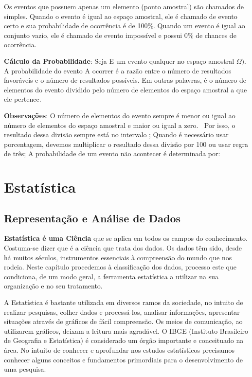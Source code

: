 \begin{multicols*}{2}
Os eventos que possuem apenas um elemento (ponto amostral) são chamados de simples. Quando o evento é igual ao espaço amostral, ele é chamado de evento certo e sua probabilidade de ocorrência é de 100\%. Quando um evento é igual ao conjunto vazio, ele é chamado de evento impossível e possui 0\% de chances de ocorrência.

\textbf{Cálculo da Probabilidade}: Seja E um evento qualquer no espaço amostral $\Omega)$. A probabilidade do evento A ocorrer é a razão entre o número de resultados favoráveis e o número de resultados possíveis. Em outras palavras, é o número de elementos do evento dividido pelo número de elementos do espaço amostral a que ele pertence.


\textbf{Observações}:  O número de elementos do evento sempre é menor ou igual ao número de elementos do espaço amostral e maior ou igual a zero. $ \ $ Por isso, o resultado dessa divisão sempre está no intervalo ; Quando é necessário usar porcentagem, devemos multiplicar o resultado dessa divisão por 100 ou usar regra de três;
A probabilidade de um evento não acontecer é determinada por:






	
\section{Estatística}

\subsection{Representação e Análise de Dados}
\textbf{ Estatística é uma Ciência} que se aplica em todos os campos do conhecimento. Costuma-se dizer que é a ciência que trata dos dados. Os dados têm sido, desde há muitos séculos, instrumentos essenciais à compreensão do mundo que nos rodeia. Neste capítulo procedemos à classificação dos dados, processo este que condiciona, de um modo geral, a ferramenta estatística a utilizar na sua organização e no seu tratamento.

A Estatística é bastante utilizada em diversos ramos da sociedade, no intuito de realizar pesquisas, colher dados e processá-los, analisar informações, apresentar situações através de gráficos de fácil compreensão. Os meios de comunicação, ao utilizarem gráficos, deixam a leitura mais agradável. O IBGE (Instituto Brasileiro de Geografia e Estatística) é considerado um órgão importante e conceituado na área. No intuito de conhecer e aprofundar nos estudos estatísticos precisamos conhecer alguns conceitos e fundamentos primordiais para o desenvolvimento de uma pesquisa.


\end{multicols*}
